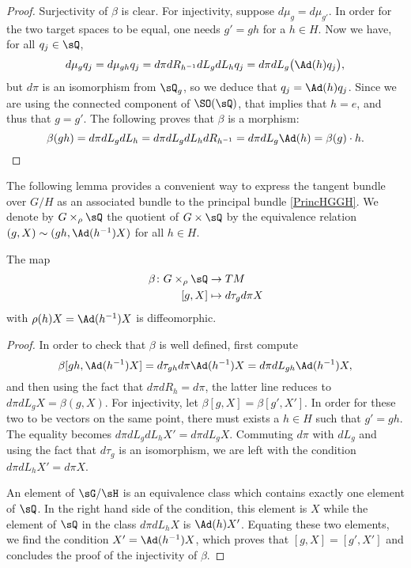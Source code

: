 \begin{proof}
Surjectivity of $\beta$ is clear. For injectivity, suppose $d\mu_g=d\mu_{g'}$. In order for the two target spaces to be equal, one needs $g'=gh$ for a $h\in H$. Now we have, for all $q_j\in\sQ$, 
\begin{equation}
  d\mu_gq_j=d\mu_{gh}q_j=d\pi dR_{h^{-1}}dL_gdL_hq_j
        =d\pi dL_g\big( \Ad(h)q_j \big),
\end{equation}
but $d\pi$ is an isomorphism from $\sQ_g$, so we deduce that $q_j=\Ad(h)q_j$. Since we are using the connected component of $\SO(\sQ)$, that implies that $h=e$, and thus that $g=g'$. The following proves that $\beta$ is a morphism:
\[ 
  \beta(gh)=d\pi dL_g dL_h=d\pi dL_g dL_h dR_{h^{-1}}=d\pi dL_g \Ad(h)=\beta(g)\cdot h.
\]
\end{proof}

The following lemma provides  a convenient way to express the tangent bundle over $G/H$ as an associated bundle to the principal bundle \eqref{PrincHGGH}. We denote by $G\times_{\rho} \sQ$ the quotient of $G\times\sQ$ by the equivalence relation $(g,X)\sim(gh,\Ad(h^{-1})X)$ for all $h\in H$.

\begin{lemma}  
The map 
\begin{equation} 
\begin{aligned}
 \beta\colon G\times_{\rho}\sQ&\to TM \\ 
[g,X]&\mapsto d\tau_gd\pi X 
\end{aligned}
\end{equation}
with $\rho(h)X=\Ad(h^{-1})X$ is diffeomorphic. 
\label{LemBazHGGH}
\end{lemma}

\begin{proof}

 In order to check that $\beta$ is well defined, first compute
\[ 
  \beta[gh,\Ad(h^{-1})X]=d\tau_{gh}d\pi\Ad(h^{-1})X=d\pi dL_{gh}\Ad(h^{-1})X,
\]
and then using the fact that $d\pi dR_h=d\pi$, the latter line reduces to $d\pi dL_gX=\beta(g,X)$. For injectivity, let $\beta[g,X]=\beta[g',X']$. In order for these two to be vectors on the same point, there must exists a $h\in H$ such that $g'=gh$. The equality becomes $d\pi dL_g dL_h X'=d\pi dL_gX$. Commuting $d\pi$ with $dL_g$ and using the fact that $d\tau_g$ is an isomorphism, we are left with the condition $d\pi dL_h X'=d\pi X$.

An element of $\sG/\sH$ is an equivalence class which contains exactly one element of $\sQ$. In the right hand side of the condition, this element is $X$ while the element of $\sQ$ in the class $d\pi dL_h X$ is $\Ad(h)X'$. Equating these two elements, we find the condition $X'=\Ad(h^{-1})X$, which proves that $[g,X]=[g',X']$ and concludes the proof of the injectivity of $\beta$.
\end{proof}

